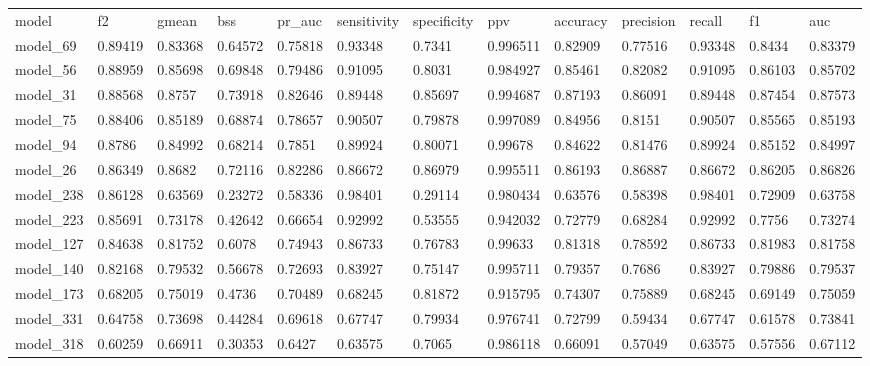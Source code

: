 \begin{tabular}{lllllllllllll}
model      & f2      & gmean   & bss      & pr\_auc & sensitivity & specificity & ppv      & accuracy & precision & recall  & f1      & auc     \\
model\_69  & 0.89419 & 0.83368 & 0.64572  & 0.75818 & 0.93348     & 0.7341      & 0.996511 & 0.82909  & 0.77516   & 0.93348 & 0.8434  & 0.83379 \\
model\_56  & 0.88959 & 0.85698 & 0.69848  & 0.79486 & 0.91095     & 0.8031      & 0.984927 & 0.85461  & 0.82082   & 0.91095 & 0.86103 & 0.85702 \\
model\_31  & 0.88568 & 0.8757  & 0.73918  & 0.82646 & 0.89448     & 0.85697     & 0.994687 & 0.87193  & 0.86091   & 0.89448 & 0.87454 & 0.87573 \\
model\_75  & 0.88406 & 0.85189 & 0.68874  & 0.78657 & 0.90507     & 0.79878     & 0.997089 & 0.84956  & 0.8151    & 0.90507 & 0.85565 & 0.85193 \\
model\_94  & 0.8786  & 0.84992 & 0.68214  & 0.7851  & 0.89924     & 0.80071     & 0.99678  & 0.84622  & 0.81476   & 0.89924 & 0.85152 & 0.84997 \\
model\_26  & 0.86349 & 0.8682  & 0.72116  & 0.82286 & 0.86672     & 0.86979     & 0.995511 & 0.86193  & 0.86887   & 0.86672 & 0.86205 & 0.86826 \\
model\_238 & 0.86128 & 0.63569 & 0.23272  & 0.58336 & 0.98401     & 0.29114     & 0.980434 & 0.63576  & 0.58398   & 0.98401 & 0.72909 & 0.63758 \\
model\_223 & 0.85691 & 0.73178 & 0.42642  & 0.66654 & 0.92992     & 0.53555     & 0.942032 & 0.72779  & 0.68284   & 0.92992 & 0.7756  & 0.73274 \\
model\_127 & 0.84638 & 0.81752 & 0.6078   & 0.74943 & 0.86733     & 0.76783     & 0.99633  & 0.81318  & 0.78592   & 0.86733 & 0.81983 & 0.81758 \\
model\_140 & 0.82168 & 0.79532 & 0.56678  & 0.72693 & 0.83927     & 0.75147     & 0.995711 & 0.79357  & 0.7686    & 0.83927 & 0.79886 & 0.79537 \\
model\_173 & 0.68205 & 0.75019 & 0.4736   & 0.70489 & 0.68245     & 0.81872     & 0.915795 & 0.74307  & 0.75889   & 0.68245 & 0.69149 & 0.75059 \\
model\_331 & 0.64758 & 0.73698 & 0.44284  & 0.69618 & 0.67747     & 0.79934     & 0.976741 & 0.72799  & 0.59434   & 0.67747 & 0.61578 & 0.73841 \\
model\_318 & 0.60259 & 0.66911 & 0.30353  & 0.6427  & 0.63575     & 0.7065      & 0.986118 & 0.66091  & 0.57049   & 0.63575 & 0.57556 & 0.67112 \\

\end{tabular}
